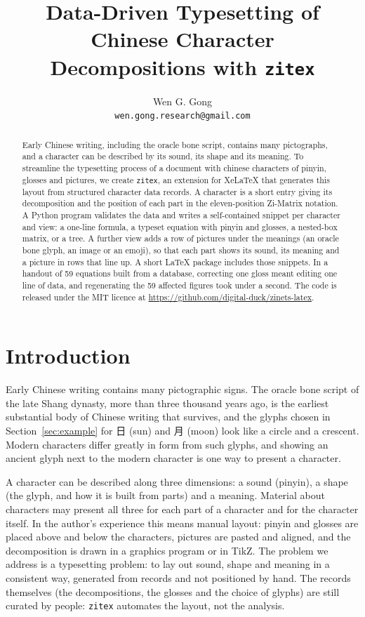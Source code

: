 \documentclass[11pt]{article}
\title{Data-Driven Typesetting of Chinese Character\\ Decompositions with \texttt{zitex}}
\author{Wen G. Gong\\ \texttt{wen.gong.research@gmail.com}}
\date{}
\begin{document}
\maketitle

\begin{abstract}
Early Chinese writing, including the oracle bone script, contains many pictographs, and a character can be described by its sound, its shape and its meaning. 
To streamline the typesetting process of a document with chinese characters of pinyin, glosses and pictures, we create \texttt{zitex}, an extension for XeLaTeX that
generates this layout from structured character data records. A character is a short entry giving its decomposition and the position of each
part in the eleven-position Zi-Matrix notation. A Python program validates the data and writes a self-contained snippet per character and
view: a one-line formula, a typeset equation with pinyin and glosses, a nested-box matrix, or a tree. A further view adds a row of pictures
under the meanings (an oracle bone glyph, an image or an emoji), so that each part shows its sound, its meaning and a picture in rows that
line up. A short \LaTeX{} package includes those snippets. In a handout of 59 equations built from a database, correcting one gloss meant editing one
line of data, and regenerating the 59 affected figures took under a second. The code is released under the MIT licence at
\url{https://github.com/digital-duck/zinets-latex}.
\end{abstract}

\section{Introduction}
Early Chinese writing contains many pictographic signs. The oracle bone script of the late Shang dynasty, more than three thousand years
ago, is the earliest substantial body of Chinese writing that survives, and the glyphs chosen in Section~\ref{sec:example} for 日 (sun) and
月 (moon) look like a circle and a crescent. Modern characters differ greatly in form from such glyphs, and showing an ancient glyph next to
the modern character is one way to present a character.

A character can be described along three dimensions: a sound (pinyin), a shape (the glyph, and how it is built from parts) and a meaning.
Material about characters may present all three for each part of a character and for the character itself. In the author's experience this
means manual layout: pinyin and glosses are placed above and below the characters, pictures are pasted and aligned, and the decomposition is
drawn in a graphics program or in TikZ. The problem we address is a typesetting problem: to lay out sound, shape and meaning in a consistent
way, generated from records and not positioned by hand. The records themselves (the decompositions, the glosses and the choice of glyphs)
are still curated by people: \texttt{zitex} automates the layout, not the analysis.
\end{document}
